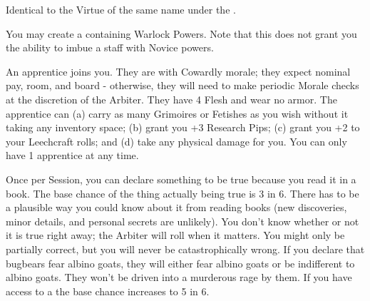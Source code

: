 \begin{multicols*}{2}

Identical to the Virtue of the same name under the .


You may create a  containing Warlock Powers. Note that this does not grant you the ability to imbue a staff with Novice powers.


An apprentice joins you.  They are  with Cowardly morale; they expect nominal pay, room, and board - otherwise, they will need to make periodic Morale checks at the discretion of the Arbiter.  They have 4 Flesh and wear no armor. The apprentice can (a) carry as many Grimoires or Fetishes as you wish without it taking any inventory space; (b) grant you +3 Research Pips; (c) grant you +2 to your Leechcraft rolls; and (d) take any physical damage for you.  You can only have 1 apprentice at any time.


Once per Session, you can declare something to be true because you read it in a book. The base chance of the thing actually being true is 3 in 6. There has to be a plausible way you could know about it from reading books (new discoveries, minor details, and personal secrets are unlikely). You don't know whether or not it is true right away; the Arbiter will roll when it matters. You might only be partially correct, but you will never be catastrophically wrong. If you declare that bugbears fear albino goats, they will either fear albino goats or be indifferent to albino goats. They won't be driven into a murderous rage by them. If you have access to a  the base chance increases to 5 in 6.

\cbreak




\end{multicols*}

